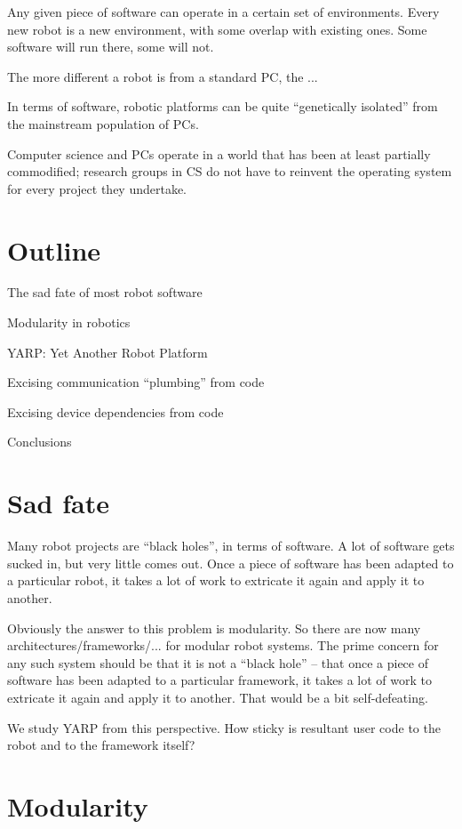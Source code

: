 Any given piece of software can operate in a certain set of 
environments.  Every new robot is a new environment, with some
overlap with existing ones.  Some software will run there,
some will not.

The more different a robot is from a standard PC, the ...

In terms of software, robotic platforms can be quite ``genetically
isolated'' from the mainstream population of PCs.  

Computer science and PCs operate in a world that has been at least
partially commodified; research groups in CS do not have to 
reinvent the operating system for every project they undertake.




\section{Outline}

The sad fate of most robot software

Modularity in robotics

YARP: Yet Another Robot Platform

Excising communication ``plumbing'' from code

Excising device dependencies from code

Conclusions


\section{Sad fate}

Many robot projects are ``black holes'', in terms of software.  A lot
of software gets sucked in, but very little comes out.  Once a piece
of software has been adapted to a particular robot, it takes a lot
of work to extricate it again and apply it to another.

Obviously the answer to this problem is modularity.  So there are 
now many architectures/frameworks/... for modular robot systems.
The prime concern for any such system should be that it is not
a ``black hole'' -- that once a piece of software has been adapted
to a particular framework, it takes a lot of work to extricate it
again and apply it to another.  That would be a bit self-defeating.

We study YARP from this perspective.  How sticky is resultant user
code to the robot and to the framework itself?

\section{Modularity}

